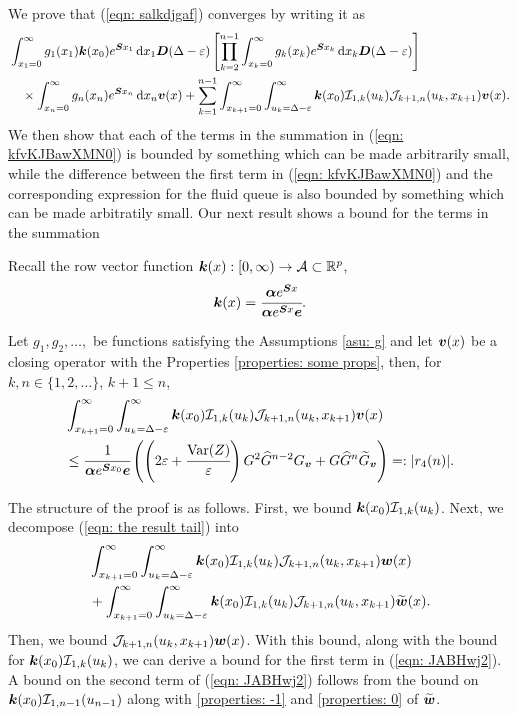 We prove that (\ref{eqn: salkdjgaf}) converges by writing it as
\begin{align}
	&\int_{x_1=0}^\infty g_1(x_1) \bs k(x_0)e^{\bs{S}x_1}\wrt x_1\bs D(\Delta-\varepsilon)
			\left[\prod_{k=2}^{n-1}\int_{x_k=0}^\infty g_k(x_k) e^{\bs{S}x_k} \wrt x_k \bs D(\Delta-\varepsilon)\right] \nonumber 
			\\&\quad \times\int_{x_n=0}^\infty g_{n}(x_n) e^{\bs{S}x_n} \wrt x_n {\bs v}(x)  
%
+\sum_{k=1}^{n-1} \int_{x_{k+1}=0}^\infty \int_{u_k=\Delta-\varepsilon}^\infty \bs k(x_0)\mathcal I_{1,k}(u_k) \mathcal J_{k+1,n}(u_k,x_{k+1}){\bs v}(x). \label{eqn: kfvKJBawXMN0}
\end{align}
We then show that each of the terms in the summation in (\ref{eqn: kfvKJBawXMN0}) is bounded by something which can be made arbitrarily small, while the difference between the first term in (\ref{eqn: kfvKJBawXMN0}) and the corresponding expression for the fluid queue is also bounded by something which can be made arbitratily small. Our next result shows a bound for the terms in the summation 

Recall the row vector function \(\boldsymbol k(x): [0,\infty)\to \mathcal A \subset \mathbb R^p\),
\[\boldsymbol k(x) = \cfrac{\boldsymbol \alpha e^{\boldsymbol Sx}}{\boldsymbol \alpha e^{\boldsymbol Sx}\boldsymbol e}.\]


\begin{cor}\label{cor: lh and rh}
	Let \(g_1, g_2, \dots,\) be functions satisfying the Assumptions \ref{asu: g} and let \(\boldsymbol v(x)\) be a closing operator with the Properties \ref{properties: some props}, then, for \(k,n \in \{1,2,\dots\}\), \(k+1\leq n\),
	\begin{align}
		&\int_{x_{k+1}=0}^\infty \int_{u_k=\Delta-\varepsilon}^\infty \boldsymbol k(x_0)\mathcal I_{1,k}(u_k) \mathcal J_{k+1,n}(u_k,x_{k+1})\boldsymbol v(x) \nonumber
            	\\&\leq \cfrac{1}{\boldsymbol \alpha e^{\boldsymbol{S}x_0}\boldsymbol e}\left(\left(2\varepsilon + \cfrac{\mathrm{Var}(Z)}{\varepsilon}\right) G^2 \widehat G^{n-2} G_{\boldsymbol v} + G\widehat G^{n}\widetilde G_{\boldsymbol v}\right)  =: |r_4(n)|. \label{eqn: the result tail}
	\end{align}
\end{cor}
The structure of the proof is as follows. First, we bound \(\boldsymbol k(x_0)\mathcal I_{1,k}(u_k) \). Next, we decompose (\ref{eqn: the result tail}) into 
\begin{align}
	&\int_{x_{k+1}=0}^\infty \int_{u_k=\Delta-\varepsilon}^\infty \boldsymbol k(x_0)\mathcal I_{1,k}(u_k) \mathcal J_{k+1,n}(u_k,x_{k+1})\boldsymbol w(x) \nonumber 
	\\&{}+ \int_{x_{k+1}=0}^\infty \int_{u_k=\Delta-\varepsilon}^\infty \boldsymbol k(x_0)\mathcal I_{1,k}(u_k) \mathcal J_{k+1,n}(u_k,x_{k+1})\widetilde{\boldsymbol w}(x). \label{eqn: JABHwj2}
\end{align} 
Then, we bound \(\mathcal J_{k+1,n}(u_k,x_{k+1})  {\boldsymbol w}(x)\). With this bound, along with the bound for \(\boldsymbol k(x_0)\mathcal I_{1,k}(u_k) \), we can derive a bound for the first term in (\ref{eqn: JABHwj2}). A bound on the second term of (\ref{eqn: JABHwj2}) follows from the bound on \(\boldsymbol k(x_0)\mathcal I_{1,n-1}(u_{n-1})\) along with \ref{properties: -1} and \ref{properties: 0} of \(\widetilde{\boldsymbol w}\).

